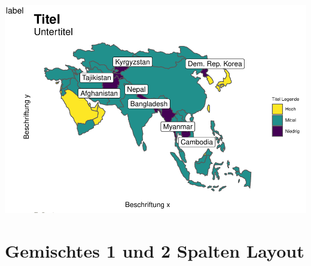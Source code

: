 \documentclass[
]{article}
\begin{document}
\includegraphics{ggplot2_files/figure-latex/unnamed-chunk-5-1.pdf}

\hypertarget{gemischtes-1-und-2-spalten-layout}{%
\section{Gemischtes 1 und 2 Spalten
Layout}\label{gemischtes-1-und-2-spalten-layout}}
\end{document}
